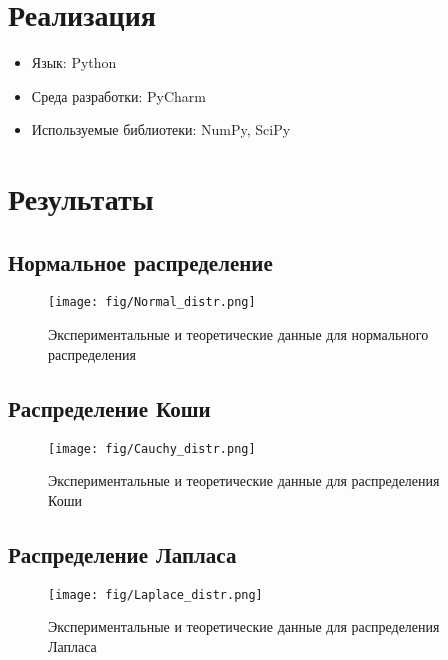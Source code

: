 \section{Реализация}
\begin{itemize}
\item Язык: Python
\item Среда разработки: PyCharm
\item Используемые библиотеки: NumPy, SciPy
\end{itemize}


\section{Результаты}
\subsection{Нормальное распределение}
\begin{figure}[H]
	\begin{center}
		\texttt{[image: fig/Normal\_distr.png]}
		\caption{Экспериментальные и теоретические данные для нормального распределения} 
		\label{pic:pic_name} %
	\end{center}
\end{figure}

\subsection{Распределение Коши}
\begin{figure}[H]
	\begin{center}
		\texttt{[image: fig/Cauchy\_distr.png]}
		\caption{Экспериментальные и теоретические данные для распределения Коши} 
		\label{pic:pic_name} %
	\end{center}
\end{figure}

\subsection{Распределение Лапласа}
\begin{figure}[H]
	\begin{center}
		\texttt{[image: fig/Laplace\_distr.png]}
		\caption{Экспериментальные и теоретические данные для распределения Лапласа} 
		\label{pic:pic_name} %
	\end{center}
\end{figure}

